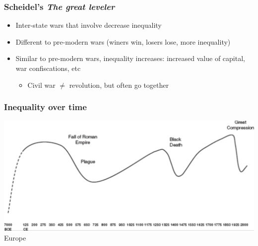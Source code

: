 \documentclass[aspectratio=43]{beamer}
\begin{document}
\begin{frame}
\frametitle{Scheidel's \textit{The great leveler}}
\centering

\begin{itemize}
  \item Inter-state wars that involve {\color{red}{mass-mobilization}} decrease inequality
  \item Different to pre-modern wars {\small (winers win, losers lose, more inequality)}
  \item<2-> {\color{red}{What about civil wars?}} Similar to pre-modern wars, inequality increases: increased value of capital, war confiscations, etc
  \begin{itemize}
    \item Civil war $\neq$ revolution, but often go together
  \end{itemize}
\end{itemize}


\end{frame}

\begin{frame}
\frametitle{Inequality over time}
\centering

\includegraphics[width = \textwidth]{img/ineq-long-term-europe}\\\vspace{15pt}Europe

\end{frame}
\end{document}
